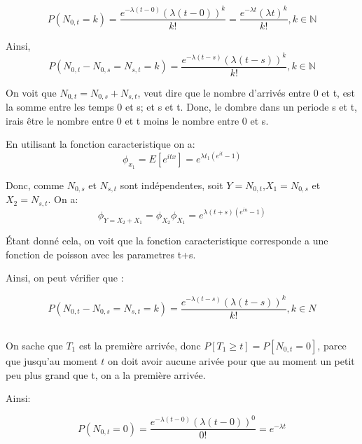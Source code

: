 \documentclass[a4paper]{article}
\begin{document}
\begin{equation*}
P(N_{0,t}=k)=\frac{e^{-\lambda (t-0)}(\lambda (t-0))^k}{k!}=\frac{e^{-\lambda t}(\lambda t)^k}{k!} , k \in \mathbb{N}
\end{equation*}

Ainsi,
\begin{equation*}
P(N_{0,t}-N_{0,s}=N_{s,t}=k)=\frac{e^{-\lambda (t-s)}(\lambda (t-s))^k}{k!} , k \in \mathbb{N}
\end{equation*}

On voit que $N_{0,t}=N_{0,s}+N_{s,t}$, veut dire que le nombre d'arrivés entre 0
et t, est  la somme entre les temps 0 et  s; et s et t. Donc,  le dombre dans un
periode s et t, irais être le nombre entre 0 et t moins le nombre entre 0 et s.

En utilisant la fonction caracteristique on a:
\begin{equation}
\phi_{x_1}=E[e^{itx}]=e^{\lambda t_1(e^{it}-1)}
\end{equation}

Donc,    comme     $N_{0,s}$    et    $N_{s,t}$     sont    indépendentes,    soit
$Y=N_{0,t}$,$X_1=N_{0,s}$ et $X_2=N_{s,t}$. On a:
\begin{equation*}
\phi_{Y=X_2+X_1}=\phi_{X_2}\phi_{X_1}=e^{\lambda (t+s)(e^{in}-1)}
\end{equation*}

Étant donné cela, on voit que la fonction caracteristique corresponde a une 
fonction de poisson avec les parametres t+s.

Ainsi, on peut vérifier que :

\begin{equation}
P(N_{0,t}-N_{0,s}=N_{s,t}=k)=\frac{e^{-\lambda (t-s)}(\lambda (t-s))^k}{k!} , k \in N
\end{equation}


\subsection{}
On sache que $T_1$ est la première arrivée, donc $P[T_1\geq t]=P[N_{0,t}=0]$, parce
que jusqu'au moment $t$ on doit avoir  aucune arivée pour que au moment un petit
peu plus grand que t, on a la première arrivée.

Ainsi:

\begin{equation*}
P(N_{0,t}=0)=\frac{e^{-\lambda (t-0)}(\lambda (t-0))^0}{0!}=e^{-\lambda t} 
\end{equation*}
\end{document}
